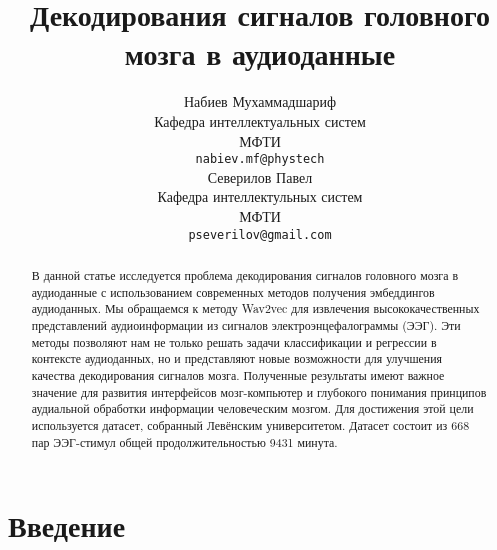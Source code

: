 \documentclass{article}
\title{Декодирования сигналов головного мозга в аудиоданные}
\author{ Набиев Мухаммадшариф \\
        Кафедра интеллектуальных систем\\
	МФТИ\\
	\texttt{nabiev.mf@phystech} \\
	\And
	Северилов Павел \\
	Кафедра интеллектульных систем\\
	МФТИ\\
	\texttt{pseverilov@gmail.com} \\
}
\date{}
\begin{document}
\maketitle

\begin{abstract}
    В данной статье исследуется проблема декодирования сигналов головного мозга в аудиоданные с использованием современных методов получения эмбеддингов аудиоданных. Мы обращаемся к методу Wav2vec для извлечения высококачественных представлений аудиоинформации из сигналов электроэнцефалограммы (ЭЭГ). Эти методы позволяют нам не только решать задачи классификации и регрессии в контексте аудиоданных, но и представляют новые возможности для улучшения качества декодирования сигналов мозга. Полученные результаты имеют важное значение для развития интерфейсов мозг-компьютер и глубокого понимания принципов аудиальной обработки информации человеческим мозгом. Для достижения этой цели используется датасет, собранный Левёнским университетом. Датасет состоит из 668 пар ЭЭГ-стимул общей продолжительностью 9431 минута. 
 
\end{abstract}



\section{Введение}





\end{document}
